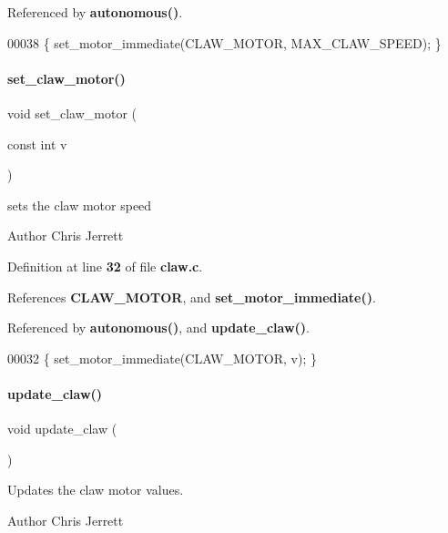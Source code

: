 Referenced by \textbf{ autonomous()}.


\begin{DoxyCode}
00038 \{ set_motor_immediate(CLAW_MOTOR, MAX_CLAW_SPEED); \}
\end{DoxyCode}
\mbox{\label{a00086_a3a57f998b1884d39b0cc786689f7086f}} 
\paragraph{set\+\_\+claw\+\_\+motor()}
{\footnotesize\ttfamily void set\+\_\+claw\+\_\+motor (\begin{DoxyParamCaption}\item[{const int}]{v }\end{DoxyParamCaption})}



sets the claw motor speed 

\begin{DoxyAuthor}{Author}
Chris Jerrett 
\end{DoxyAuthor}


Definition at line \textbf{ 32} of file \textbf{ claw.\+c}.



References \textbf{ C\+L\+A\+W\+\_\+\+M\+O\+T\+OR}, and \textbf{ set\+\_\+motor\+\_\+immediate()}.



Referenced by \textbf{ autonomous()}, and \textbf{ update\+\_\+claw()}.


\begin{DoxyCode}
00032 \{ set_motor_immediate(CLAW_MOTOR, v); \}
\end{DoxyCode}
\mbox{\label{a00086_a0122b78972344264b8a276a559cfce4a}} 
\paragraph{update\+\_\+claw()}
{\footnotesize\ttfamily void update\+\_\+claw (\begin{DoxyParamCaption}{ }\end{DoxyParamCaption})}



Updates the claw motor values. 

\begin{DoxyAuthor}{Author}
Chris Jerrett 
\end{DoxyAuthor}


